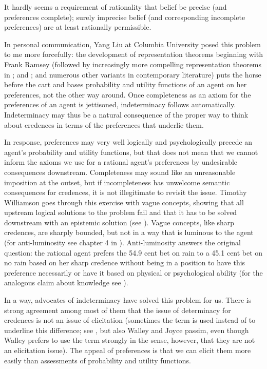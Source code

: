 \documentclass[11pt]{article}
\begin{document}
\begin{quotex}
  It hardly seems a requirement of rationality that belief be precise
  (and preferences complete); surely imprecise belief (and
  corresponding incomplete preferences) are at least rationally
  permissible. 
\end{quotex}

In personal communication, Yang Liu at Columbia University posed this
problem to me more forcefully: the development of representation
theorems beginning with Frank Ramsey (followed by increasingly more
compelling representation theorems in ; and
; and numerous other variants in contemporary
literature) puts the horse before the cart and bases probability and
utility functions of an agent on her preferences, not the other way
around. Once completeness as an axiom for the preferences of an agent
is jettisoned, indeterminacy follows automatically. Indeterminacy may
thus be a natural consequence of the proper way to think about
credences in terms of the preferences that underlie them.

In response, preferences may very well logically and psychologically
precede an agent's probability and utility functions, but that does
not mean that we cannot inform the axioms we use for a rational
agent's preferences by undesirable consequences downstream.
Completeness may sound like an unreasonable imposition at the outset,
but if incompleteness has unwelcome semantic consequences for
credences, it is not illegitimate to revisit the issue. Timothy
Williamson goes through this exercise with vague concepts, showing
that all upstream logical solutions to the problem fail and that it
has to be solved downstream with an epistemic solution (see
). Vague concepts, like sharp credences, are
sharply bounded, but not in a way that is luminous to the agent (for
anti-luminosity see chapter 4 in ).
Anti-luminosity answers the original question: the rational agent
prefers the 54.9 cent bet on rain to a 45.1 cent bet on no rain based
on her sharp credence without being in a position to have this
preference necessarily or have it based on physical or psychological
ability (for the analogous claim about knowledge see
).

In a way, advocates of indeterminacy have solved this problem for us.
There is strong agreement among most of them that the issue of
determinacy for credences is not an issue of elicitation (sometimes
the term  is used instead of 
to underline this difference; see , but also
Walley and Joyce passim, even though Walley prefers to use the term
 strongly in the sense, however, that they are not
an elicitation issue). The appeal of preferences is that we can elicit
them more easily than assessments of probability and utility
functions. 
\end{document}
